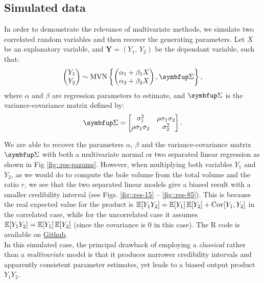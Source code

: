 \subsection{Simulated data}
In order to demonstrate the relevance of multivariate methods, we simulate two correlated random variables and then recover the generating parameters. Let \( X \) be an explanatory variable, and \( \mathbf{Y} = (Y_1, \, Y_2) \) be the dependant variable, such that:
\[
	\begin{pmatrix}
		Y_1 \\
		Y_2
	\end{pmatrix} \sim
	\MVN\left\{ \begin{pmatrix}
		\alpha_1 + \beta_1 X \\
		\alpha_2 + \beta_2 X \\
	\end{pmatrix}, \Sigmabf \right\},
\]
where \( \alpha \) and \( \beta \) are regression parameters to estimate, and \( \Sigmabf \) is the variance-covariance matrix defined by:
\[
	\Sigmabf = \begin{bmatrix}
		\sigma_1^2 & \rho \sigma_1 \sigma_2 \\
		\rho \sigma_1 \sigma_2 & \sigma_2^2
	\end{bmatrix}. \\
\]

We are able to recover the parameters \( \alpha \), \( \beta \) and the variance-covariance matrix \( \Sigmabf \) with both a multivariate normal or two separated linear regression as shown in Fig \ref{fig::res-params}. However, when multiplying both variables \( Y_1 \) and \( Y_2 \), as we would do to compute the bole volume from the total volume and the ratio \( r \), we see that the two separated linear models give a biased result with a smaller credibility interval (see Figs. \ref{fig::res-15} -- \ref{fig::res-85}). This is because the real expected value for the product is \( \operatorname{\mathbb{E}}[Y_1 Y_2] = \operatorname{\mathbb{E}}[Y_1] \operatorname{\mathbb{E}}[Y_2] + \operatorname{Cov}[Y_1, Y_2] \) in the correlated case, while for the uncorrelated case it assumes \( \operatorname{\mathbb{E}}[Y_1 Y_2] = \operatorname{\mathbb{E}}[Y_1] \operatorname{\mathbb{E}}[Y_2] \) (since the covariance is \num{0} in this case). The R code is available on \href{https://github.com/amael-ls/emerge/tree/main/communications/cst/2025-10-30/code}{ Github}. \\

In this simulated case, the principal drawback of employing a \textit{classical} rather than a \textit{multivariate} model is that it produces narrower credibility intervals and apparently consistent parameter estimates, yet leads to a biased output product \( Y_1 Y_2\).

